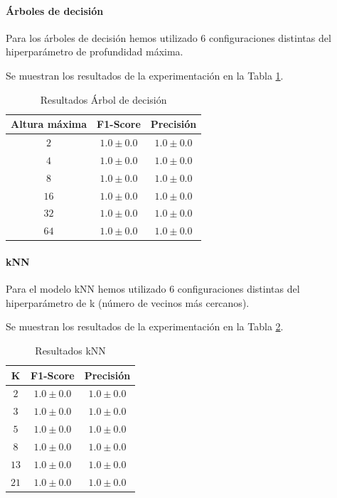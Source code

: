 \documentclass[12pt]{article}
\begin{document}
\paragraph{Árboles de decisión}
Para los árboles de decisión hemos utilizado 6 configuraciones distintas del hiperparámetro de profundidad máxima.

Se muestran los resultados de la experimentación en la Tabla \ref{Tab:DecisionTree_1}.

\begin{table}[!ht]
	\caption{Resultados Árbol de decisión}
	\centering
		 \begin{tabular}{||c c c||}
			 \hline
			 Altura máxima & F1-Score & Precisión  \\ [0.5ex]
			 \hline\hline
			 $2$ & $1.0 \pm 0.0$ & $1.0 \pm 0.0$ \\
			 \hline
			 $4$ & $1.0 \pm 0.0$ & $1.0 \pm 0.0$ \\
			 \hline
			 $8$ & $1.0 \pm 0.0$ & $1.0 \pm 0.0$ \\
			 \hline
			 $16$ & $1.0 \pm 0.0$ & $1.0 \pm 0.0$ \\
			 \hline
			 $32$ & $1.0 \pm 0.0$ & $1.0 \pm 0.0$ \\
			 \hline
			 $64$ & $1.0 \pm 0.0$ & $1.0 \pm 0.0$ \\
			 \hline
		 \end{tabular}
	\label{Tab:DecisionTree_1}
\end{table}

\paragraph{kNN}
Para el modelo kNN hemos utilizado 6 configuraciones distintas del hiperparámetro de k (número de vecinos más cercanos).

Se muestran los resultados de la experimentación en la Tabla \ref{Tab:kNN_1}.

\begin{table}[!ht]
	\caption{Resultados kNN}
	\centering
		\begin{tabular}{||c c c||}
			\hline
			K & F1-Score & Precisión  \\ [0.5ex]
			\hline\hline
			$2$ & $1.0 \pm 0.0$ & $1.0 \pm 0.0$ \\
			\hline
			$3$ & $1.0 \pm 0.0$ & $1.0 \pm 0.0$ \\
			\hline
			$5$ & $1.0 \pm 0.0$ & $1.0 \pm 0.0$ \\
			\hline
			$8$ & $1.0 \pm 0.0$ & $1.0 \pm 0.0$ \\
			\hline
			$13$ & $1.0 \pm 0.0$ & $1.0 \pm 0.0$ \\
			\hline
			$21$ & $1.0 \pm 0.0$ & $1.0 \pm 0.0$ \\
			\hline
		\end{tabular}
	\label{Tab:kNN_1}
\end{table}
\end{document}
